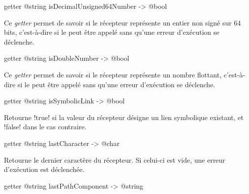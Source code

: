 
\begin{galgas3box}
getter @string isDecimalUnsigned64Number -> @bool
\end{galgas3box}

Ce \emph{getter} permet de savoir si le récepteur représente un entier non signé sur 64 bits, c'est-à-dire si le  peut être appelé sans qu'une erreur d'exécution se déclenche.







\begin{galgas3box}
getter @string isDoubleNumber -> @bool
\end{galgas3box}

Ce \emph{getter} permet de savoir si le récepteur représente un nombre flottant, c'est-à-dire si le  peut être appelé sans qu'une erreur d'exécution se déclenche.








\begin{galgas3box}
getter @string isSymbolicLink -> @bool
\end{galgas3box}

Retourne \ggst!true! si la valeur du récepteur désigne un lien symbolique existant, et \ggst!false! dans le cas contraire.









\begin{galgas3box}
getter @string lastCharacter -> @char
\end{galgas3box}

Retourne le dernier caractère du récepteur. Si celui-ci est vide, une erreur d'exécution est déclenchée.









\begin{galgas3box}
getter @string lastPathComponent -> @string
\end{galgas3box}

